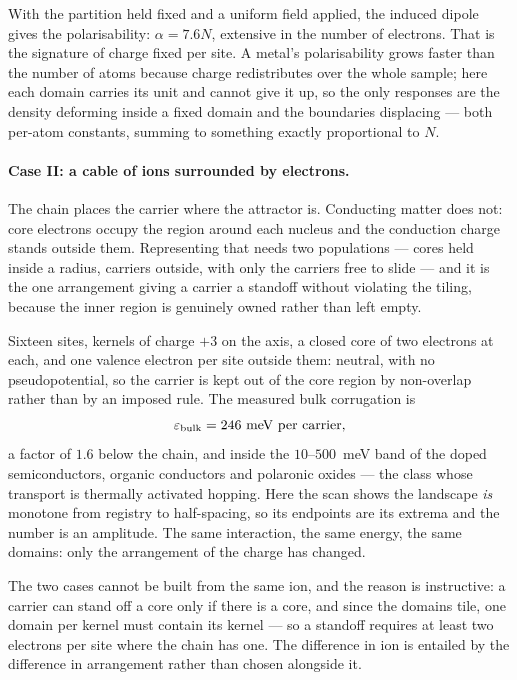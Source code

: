 With the partition held fixed and a uniform field applied, the induced dipole gives the
polarisability: $\alpha=7.6N$, extensive in the number of electrons. That is the signature of charge
fixed per site. A metal's polarisability grows faster than the number of atoms because charge
redistributes over the whole sample; here each domain carries its unit and cannot give it up, so the
only responses are the density deforming inside a fixed domain and the boundaries displacing --- both
per-atom constants, summing to something exactly proportional to $N$.

\paragraph{Case II: a cable of ions surrounded by electrons.}
The chain places the carrier where the attractor is. Conducting matter does not: core electrons
occupy the region around each nucleus and the conduction charge stands outside them. Representing
that needs two populations --- cores held inside a radius, carriers outside, with only the carriers
free to slide --- and it is the one arrangement giving a carrier a standoff without violating the
tiling, because the inner region is genuinely owned rather than left empty.

Sixteen sites, kernels of charge $+3$ on the axis, a closed core of two electrons at each, and one
valence electron per site outside them: neutral, with no pseudopotential, so the carrier is kept out
of the core region by non-overlap rather than by an imposed rule. The measured bulk corrugation is
\[
\varepsilon_{\rm bulk} = 246~\text{meV per carrier},
\]
a factor of $1.6$ below the chain, and inside the $10$--$500$~meV band of the doped semiconductors,
organic conductors and polaronic oxides --- the class whose transport is thermally activated
hopping. Here the scan shows the landscape \emph{is} monotone from registry to half-spacing, so its
endpoints are its extrema and the number is an amplitude. The same interaction, the same energy, the
same domains: only the arrangement of the charge has changed.

The two cases cannot be built from the same ion, and the reason is instructive: a carrier can stand
off a core only if there is a core, and since the domains tile, one domain per kernel must contain
its kernel --- so a standoff requires at least two electrons per site where the chain has one. The
difference in ion is entailed by the difference in arrangement rather than chosen alongside it.

